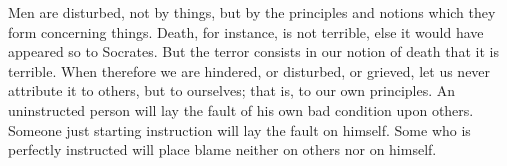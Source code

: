 Men are disturbed, not by things, but by the principles and notions
which they form concerning things. Death, for instance, is not terrible,
else it would have appeared so to Socrates. But the terror consists
in our notion of death that it is terrible. When therefore we are
hindered, or disturbed, or grieved, let us never attribute it to others,
but to ourselves; that is, to our own principles. An uninstructed
person will lay the fault of his own bad condition upon others. Someone
just starting instruction will lay the fault on himself. Some who
is perfectly instructed will place blame neither on others nor on
himself. 

